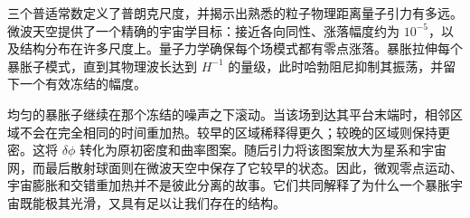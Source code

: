 三个普适常数定义了普朗克尺度，并揭示出熟悉的粒子物理距离量子引力有多远。微波天空提供了一个精确的宇宙学目标：接近各向同性、涨落幅度约为 \(10^{-5}\)，以及结构分布在许多尺度上。量子力学确保每个场模式都有零点涨落。暴胀拉伸每个暴胀子模式，直到其物理波长达到 \(H^{-1}\) 的量级，此时哈勃阻尼抑制其振荡，并留下一个有效冻结的幅度。

均匀的暴胀子继续在那个冻结的噪声之下滚动。当该场到达其平台末端时，相邻区域不会在完全相同的时间重加热。较早的区域稀释得更久；较晚的区域则保持更密。这将 \(\delta\phi\) 转化为原初密度和曲率图案。随后引力将该图案放大为星系和宇宙网，而最后散射球面则在微波天空中保存了它较早的状态。因此，微观零点运动、宇宙膨胀和交错重加热并不是彼此分离的故事。它们共同解释了为什么一个暴胀宇宙既能极其光滑，又具有足以让我们存在的结构。

